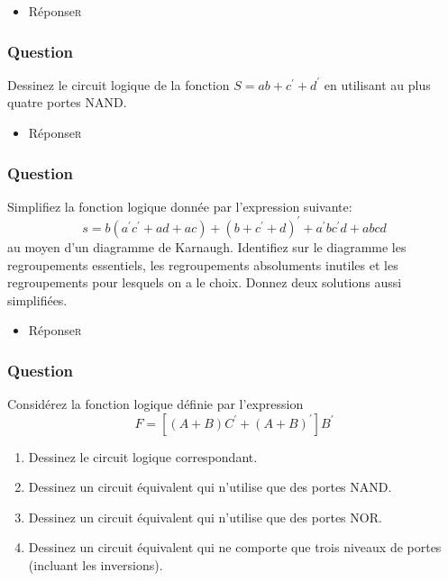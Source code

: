 \documentclass[11pt]{article}
\begin{document}
\begin{itemize}
\item Réponse\hfill{}\textsc{r}
\label{sec:orgcd2b397}
\end{itemize}

\subsubsection*{Question}
\label{sec:orgc9f2b9f}
Dessinez le circuit logique de la fonction \(S = a b + c^\prime +
    d^\prime\) en utilisant au plus quatre portes NAND.

\begin{itemize}
\item Réponse\hfill{}\textsc{r}
\label{sec:orgdadf4bb}
\end{itemize}

\subsubsection*{Question}
\label{sec:orga11dea1}
Simplifiez la fonction logique donnée par l'expression suivante:
  $$
    s = b (a^{\prime} c^{\prime} + a d + a c) + (b + c^{\prime}+
      d)^{\prime} + a^{\prime} b c^{\prime} d + a b c d
    $$ 
  au moyen d'un
  diagramme de Karnaugh. Identifiez sur le diagramme les regroupements
  essentiels, les regroupements absoluments inutiles et les
  regroupements pour lesquels on a le choix. Donnez deux solutions
  aussi simplifiées.

\begin{itemize}
\item Réponse\hfill{}\textsc{r}
\label{sec:org7cbc562}
\end{itemize}

\subsubsection*{Question}
\label{sec:org7e7d983}
Considérez la fonction logique définie par l'expression 
  $$
    F = [ (A + B) C^{\prime} + (A+B)^{\prime} ] B^{\prime}
    $$

\begin{enumerate}
\item Dessinez le circuit logique correspondant.

\item Dessinez un circuit équivalent qui n'utilise que des portes
NAND.

\item Dessinez un circuit équivalent qui n'utilise que des portes
NOR.

\item Dessinez un circuit équivalent qui ne comporte que trois niveaux de
portes (incluant les inversions).
\end{enumerate}
\end{document}
